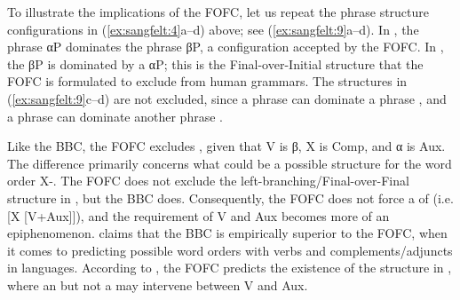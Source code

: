 \documentclass[output=paper, colorlinks, citecolor=brown]{langscibook}
\begin{document}
To illustrate the implications of the FOFC, let us repeat the phrase structure configurations in (\ref{ex:sangfelt:4}a–d) above; see (\ref{ex:sangfelt:9}a–d). In , the  phrase αP dominates the  phrase βP, a configuration accepted by the FOFC. In , the  βP is dominated by a  αP; this is the Final-over-Initial structure that the FOFC is formulated to exclude from human grammars. The structures in (\ref{ex:sangfelt:9}c–d) are not excluded, since a  phrase can dominate a  phrase , and a  phrase can dominate another  phrase .

\settowidth{}
\ea\label{ex:sangfelt:9}
\z 
\z 


Like the BBC, the FOFC excludes , given that V is β, X is Comp, and α is Aux. The difference primarily concerns what could be a possible structure for the word order X-. The FOFC does not exclude the left-branching/Final-over-Final structure in , but the BBC does. Consequently, the FOFC does not force a  of  (i.e. [X [V+Aux]]), and the  requirement of V and Aux becomes more of an epiphenomenon. \citet[132--133]{Haider2013} claims that the BBC is empirically superior to the FOFC, when it comes to predicting possible word orders with verbs and complements\slash adjuncts in  languages. According to \citet[133]{Haider2013}, the FOFC predicts the existence of the structure in , where an  but not a  may intervene between V and Aux.
\end{document}
